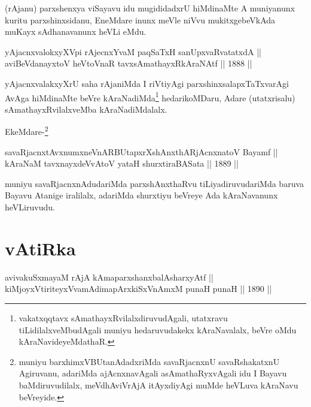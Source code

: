 \begin{artha}
(rAjanu) parxshenxya viSayavu idu mugididadxrU hiMdinaMte
A muniyanunx kuritu parxshinxsidanu, EneMdare inunx meVle niVvu
mukitxgebeVkAda muKayx sAdhanavanunx heVLi eMdu.
\end{artha}

\begin{shl}
yAjacnxvalokxyXV\s pi rAjecnxYvaM paqSaTxH sanUpxvaRvatatxdA || \\
aviBeVdanayxtoV heVtoVnaR tavxsAmathayxRkAraNAtf \hfill || 1888 ||
  
\end{shl}

\begin{artha}
yAjacnxvalakxyXrU saha rAjaniMda I riVtiyAgi parxshinxsalapxTaTxvarAgi
AvAga hiMdinaMte beVre kAraNadiMda\footnote{vakatxqqtavx
sAmathayxRvilalxdiruvudAgali, utatxravu tiLidilalxveMbudAgali muniyu
hedaruvudakekx kAraNavalalx, beVre oMdu kAraNavideyeMdathaR.} hedarikoMDaru, Adare
(utatxrisalu) sAmathayxRvilalxveMba kAraNadiMdalalx.

EkeMdare-\footnote{muniyu barxhimxVBUtanAdadxriMda savaRjacnxnU
savaRshakatxnU Agiruvanu, adariMda ajAcnxnavAgali asAmathaRyxvAgali
idu I Bayavu baMdiruvudilalx, meVdhAviVrAjA itAyxdiyAgi muMde
heVLuva kAraNavu beVreyide.}
\end{artha}

\begin{shl}
savaRjacnxtAvxnumxneVnARBUtapxrXshAnxthARjAcnxnatoV Bayamf ||  \\
kAraNaM tavxnayxdeVvAtoV yataH shurxtiraBASata \hfill || 1889 ||
  
\end{shl}

\begin{artha}
muniyu savaRjacnxnAdudariMda parxshAnxthaRvu tiLiyadiruvudariMda
baruva Bayavu Atanige iralilalx, adariMda shurxtiyu beVreye Ada
kAraNavanunx heVLiruvudu.
\end{artha}

\section*{vAtiRka}

\begin{shl}
avivakuSxmayaM rAjA kAmaparxshanxbalAsharxyAtf || \\
kiMjoyxVtiriteyxVvamAdimapArxkiSxVnAmxM punaH punaH \hfill || 1890 ||
  
\end{shl}

